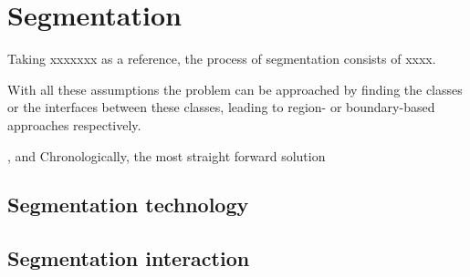 \graphicspath{ {./content/analysis/figures/} }

\section{Segmentation}
\label{sec:seg-analysis}

Taking xxxxxxx as a reference, the process of segmentation consists of xxxx.

With all these assumptions the problem can be approached by finding the classes or the interfaces between these classes, leading to region- or boundary-based approaches respectively.

, and Chronologically, the most straight forward solution 

\subsection{Segmentation technology}
\subsection{Segmentation interaction}

